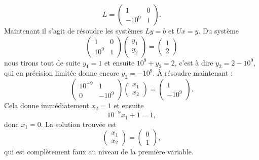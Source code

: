 \begin{example}
    \begin{equation}
        L=\begin{pmatrix}
            1    &   0    \\ 
            -10^9    &   1    
        \end{pmatrix}.
    \end{equation}
    Maintenant il s'agit de résoudre les systèmes \( Ly=b\) et \( Ux=y\). Du système
    \begin{equation}
        \begin{pmatrix}
            1    &   0    \\ 
            10^9    &   1    
        \end{pmatrix}\begin{pmatrix}
            y_1    \\ 
            y_2    
        \end{pmatrix}=\begin{pmatrix}
            1    \\ 
            2    
        \end{pmatrix}
    \end{equation}
    nous tirons tout de suite \( y_1=1\) et ensuite \( 10^9+y_2=2\), c'est à dire \( y_2=2-10^9\), qui en précision limitée donne encore \( y_2=-10^9\). À résoudre maintenant :
    \begin{equation}
        \begin{pmatrix}
            10^{-9}    &   1    \\ 
            0    &   -10^9    
        \end{pmatrix}\begin{pmatrix}
            x_1    \\ 
            x_2    
        \end{pmatrix}=\begin{pmatrix}
            1    \\ 
            -10^9    
        \end{pmatrix}.
    \end{equation}
    Cela donne immédiatement \( x_2=1\) et ensuite
    \begin{equation}
        10^{-9}x_1+1=1, 
    \end{equation}
    donc \( x_1=0\). La solution trouvée est
    \begin{equation}        \label{EQooBGWEooVGSVoe}
        \begin{pmatrix}
            x_1    \\ 
            x_2    
        \end{pmatrix}=\begin{pmatrix}
            0    \\ 
            1    
        \end{pmatrix},
    \end{equation}
    qui est complètement faux au niveau de la première variable.
\end{example}

